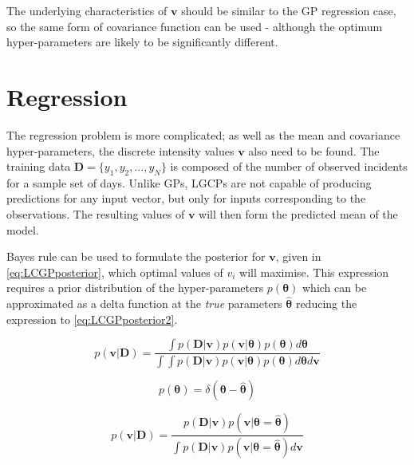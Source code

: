 \documentclass[a4paper,11pt]{report}
\begin{document}
The underlying characteristics of \(\mathbf{v}\) should be similar to the GP regression case, so the same form of covariance function can be used - although the optimum hyper-parameters are likely to be significantly different.

\section{Regression}

The regression problem is more complicated; as well as the mean and covariance hyper-parameters, the discrete intensity values \(\mathbf{v}\) also need to be found. The training data \(\mathbf{D} = \{y_1,y_2, ..., y_N\}\) is composed of the number of observed incidents for a sample set of days. Unlike GPs, LGCPs are not capable of producing predictions for any input vector, but only for inputs corresponding to the observations. The resulting values of \(\mathbf{v}\) will then form the predicted mean of the model. \par

Bayes rule can be used to formulate the posterior for \(\mathbf{v}\), given in \ref{eq:LCGPposterior}, which optimal values of \(v_i\) will maximise. This expression requires a prior distribution of the hyper-parameters \(p(\boldsymbol{\theta})\) which can be approximated as a delta function at the \textit{true} parameters \(\hat{\boldsymbol{\theta}}\) reducing the expression to \ref{eq:LCGPposterior2}.

\singlespacing

\begin{equation} \label{eq:LCGPposterior}
p(\mathbf{v | D}) = \frac{\int{p(\mathbf{D|v})p(\mathbf{v}|\boldsymbol{\theta})p(\boldsymbol{\theta}) d\boldsymbol{\theta}}}{\int{\int{p(\mathbf{D|v})p(\mathbf{v}|\boldsymbol{\theta})p(\boldsymbol{\theta}) d\boldsymbol{\theta} d\mathbf{v}}}}
\end{equation}

\begin{equation}
p(\boldsymbol{\theta}) = \delta(\boldsymbol{\theta} - \hat{\boldsymbol{\theta}})
\end{equation}

\begin{equation} \label{eq:LCGPposterior2}
p(\mathbf{v | D}) = \frac{p(\mathbf{D|v})p(\mathbf{v}|\boldsymbol{\theta}=\hat{\boldsymbol{\theta}}) }{\int{p(\mathbf{D|v})p(\mathbf{v}|\boldsymbol{\theta}=\hat{\boldsymbol{\theta}}) d\mathbf{v}}}
\end{equation}
\end{document}

